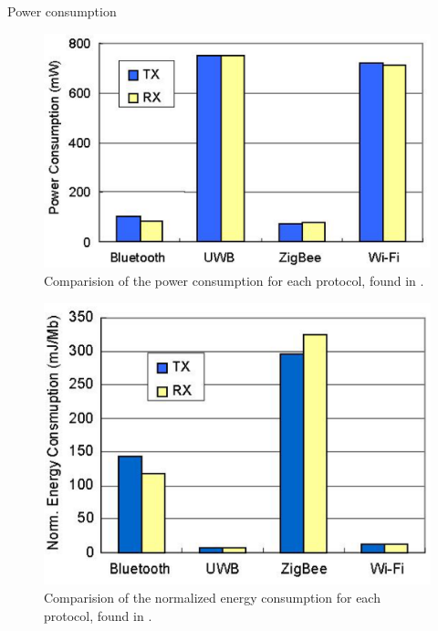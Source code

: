 \documentclass[10pt,a4paper]{article}
\begin{document}
Power consumption
\begin{figure}[H]
   \centering
   \includegraphics[width=1\textwidth]{images/protocolenergy.png}
   \caption{Comparision of the power consumption for each protocol, found in \cite{comparitivestudywirelessprotocols}.}
   \label{fig:protocolenergy}
\end{figure}

\begin{figure}[H]
   \centering
   \includegraphics[width=1\textwidth]{images/protocolenergynormalized.png}
   \caption{Comparision of the normalized energy consumption for each protocol, found in \cite{comparitivestudywirelessprotocols}.}
   \label{fig:protocolenergynormalized}
\end{figure}
\end{document}
